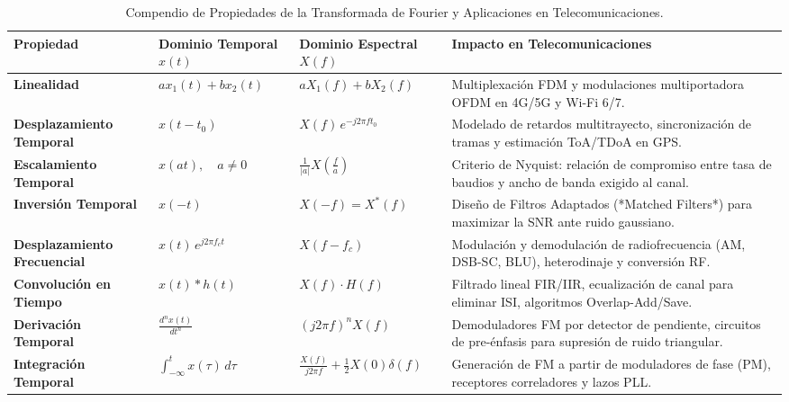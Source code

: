 \documentclass[11pt,a4paper]{article}
\begin{document}
\begin{table}[htbp]
  \centering
  \small
  \caption{Compendio de Propiedades de la Transformada de Fourier y Aplicaciones en Telecomunicaciones.}
  \label{tab:resumen_propiedades}
  \renewcommand{\arraystretch}{1.5}
  \begin{tabularx}{\linewidth}{>{\bfseries}p{2.8cm} >{\centering\arraybackslash}p{3.1cm} >{\centering\arraybackslash}p{3.3cm} >{\raggedright\arraybackslash}X}
    \toprule
    \textbf{Propiedad} & \textbf{Dominio Temporal} $x(t)$ & \textbf{Dominio Espectral} $X(f)$ & \textbf{Impacto en Telecomunicaciones} \\
    \midrule
    Linealidad & $a x_1(t) + b x_2(t)$ & $a X_1(f) + b X_2(f)$ & Multiplexaci\'on FDM y modulaciones multiportadora OFDM en 4G/5G y Wi-Fi 6/7. \\
    Desplazamiento Temporal & $x(t - t_0)$ & $X(f) \, e^{-j 2\pi f t_0}$ & Modelado de retardos multitrayecto, sincronizaci\'on de tramas y estimaci\'on ToA/TDoA en GPS. \\
    Escalamiento Temporal & $x(at), \quad a \ne 0$ & $\frac{1}{|a|} X\left(\frac{f}{a}\right)$ & Criterio de Nyquist: relaci\'on de compromiso entre tasa de baudios y ancho de banda exigido al canal. \\
    Inversi\'on Temporal & $x(-t)$ & $X(-f) = X^*(f)$ & Dise\~no de Filtros Adaptados (*Matched Filters*) para maximizar la SNR ante ruido gaussiano. \\
    Desplazamiento Frecuencial & $x(t) \, e^{j 2\pi f_c t}$ & $X(f - f_c)$ & Modulaci\'on y demodulaci\'on de radiofrecuencia (AM, DSB-SC, BLU), heterodinaje y conversi\'on RF. \\
    Convoluci\'on en Tiempo & $x(t) * h(t)$ & $X(f) \cdot H(f)$ & Filtrado lineal FIR/IIR, ecualizaci\'on de canal para eliminar ISI, algoritmos Overlap-Add/Save. \\
    Derivaci\'on Temporal & $\frac{d^n x(t)}{dt^n}$ & $(j 2\pi f)^n X(f)$ & Demoduladores FM por detector de pendiente, circuitos de pre-\'enfasis para supresi\'on de ruido triangular. \\
    Integraci\'on Temporal & $\int_{-\infty}^t x(\tau) \, d\tau$ & $\frac{X(f)}{j 2\pi f} + \frac{1}{2}X(0)\delta(f)$ & Generaci\'on de FM a partir de moduladores de fase (PM), receptores correladores y lazos PLL. \\
    \bottomrule
  \end{tabularx}
\end{table}

\end{document}
